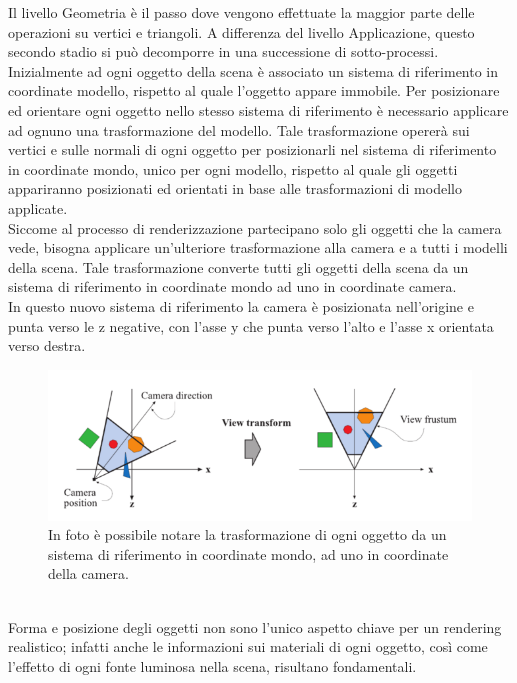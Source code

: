 Il livello Geometria è il passo dove vengono effettuate la maggior parte delle operazioni su vertici e triangoli. A differenza del livello Applicazione, questo secondo stadio si può decomporre in una successione di sotto-processi.
\\
Inizialmente ad ogni oggetto della scena è associato un sistema di riferimento in coordinate modello, rispetto al quale l’oggetto appare immobile. 
Per posizionare ed orientare ogni oggetto nello stesso sistema di riferimento è necessario applicare ad ognuno una trasformazione del modello.  Tale trasformazione opererà sui vertici e sulle normali di ogni oggetto per posizionarli nel sistema di riferimento in coordinate mondo, unico per ogni modello, rispetto al quale gli oggetti appariranno posizionati ed orientati in base alle trasformazioni di modello applicate.
\\
Siccome al processo di renderizzazione partecipano solo gli oggetti che la camera vede, bisogna applicare un’ulteriore trasformazione alla camera e a tutti i modelli della scena. 
Tale trasformazione converte tutti gli oggetti della scena da un sistema di riferimento in coordinate mondo ad uno in coordinate camera.
\\ 
In questo nuovo sistema di riferimento la camera è posizionata nell’origine e punta verso le z negative, con l’asse y che punta verso l’alto e l’asse x orientata verso destra.
\\
\begin{figure}[htb]
 \centering
 \includegraphics[width=1.0\linewidth]{images/chapter_stato_arte/stato_arte_view_transform.png}\hfill
 \caption[Trasformazione della vista]{In foto è possibile notare la trasformazione di ogni oggetto da un sistema di riferimento in coordinate mondo, ad uno in coordinate della camera.}
 \label{fig:stato_arte_trasfvista}
\end{figure}
\\
Forma e posizione degli oggetti non sono l’unico aspetto chiave per un rendering realistico; infatti anche le informazioni sui materiali di ogni oggetto, così come l’effetto di ogni fonte luminosa nella scena, risultano fondamentali.
